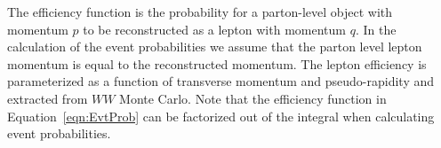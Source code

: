 The efficiency function is the probability for a parton-level object with momentum 
$p$ to be reconstructed as a lepton with momentum $q$. In the calculation of the event 
probabilities we assume that the parton level lepton momentum is equal to the reconstructed 
momentum. The lepton efficiency is parameterized as a function of transverse momentum and 
pseudo-rapidity and extracted from $WW$ Monte Carlo. 
Note that the efficiency function in Equation~\ref{eqn:EvtProb} can be factorized out of
the integral when calculating event probabilities.



